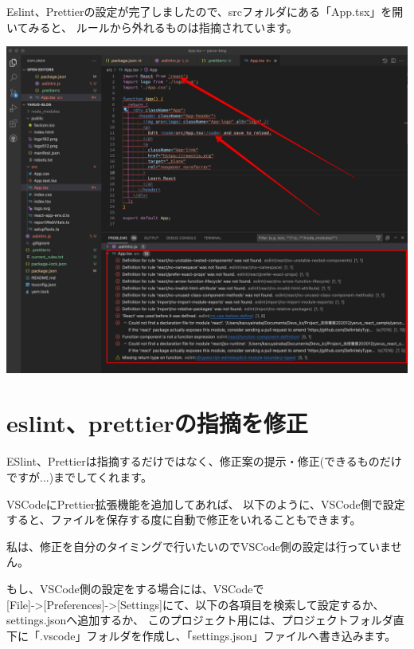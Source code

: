 Eslint、Prettierの設定が完了しましたので、srcフォルダにある「App.tsx」を開いてみると、
ルールから外れるものは指摘されています。

\begin{reviewimage}[H]%
\includegraphics[width=1.0\maxwidth]{./images/02-create-react-app/03_eslint_prettier.png}%
\label{image:02-create-react-app:03_eslint_prettier}
\end{reviewimage}

\section{eslint、prettierの指摘を修正}
\keeplastskip{
  \label{sec:2-5}
  \label{sec-04fix}
  \par\nobreak
}

ESlint、Prettierは指摘するだけではなく、修正案の提示・修正(できるものだけですが...)までしてくれます。

VSCodeにPrettier拡張機能を追加してあれば、
以下のように、VSCode側で設定すると、ファイルを保存する度に自動で修正をいれることもできます。

私は、修正を自分のタイミングで行いたいのでVSCode側の設定は行っていません。

もし、VSCode側の設定をする場合には、VSCodeで\\[0pt]
[File]{-}\textgreater{}[Preferences]{-}\textgreater{}[Settings]にて、以下の各項目を検索して設定するか、settings.jsonへ追加するか、
このプロジェクト用には、プロジェクトフォルダ直下に「.vscode」フォルダを作成し、「settings.json」ファイルへ書き込みます。

